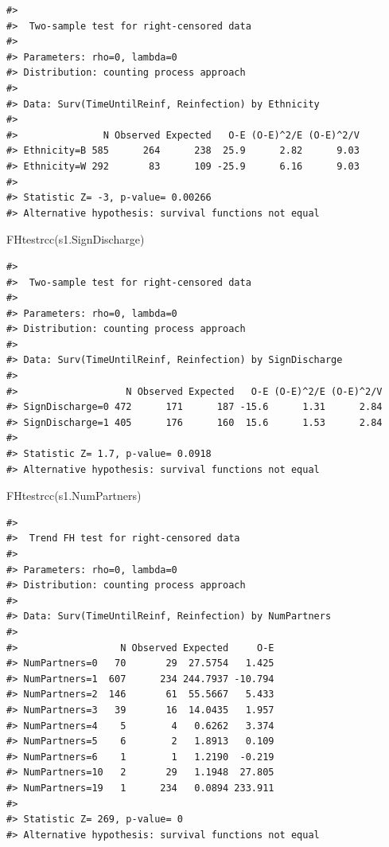 \documentclass[
]{article}
\newenvironment{Shaded}{\begin{snugshade}}{\end{snugshade}}
\newcommand{\FunctionTok}[1]{\textcolor[rgb]{0.00,0.00,0.00}{#1}}
\newcommand{\NormalTok}[1]{#1}
\begin{document}
\begin{verbatim}
#> 
#>  Two-sample test for right-censored data
#> 
#> Parameters: rho=0, lambda=0
#> Distribution: counting process approach
#> 
#> Data: Surv(TimeUntilReinf, Reinfection) by Ethnicity
#> 
#>               N Observed Expected   O-E (O-E)^2/E (O-E)^2/V
#> Ethnicity=B 585      264      238  25.9      2.82      9.03
#> Ethnicity=W 292       83      109 -25.9      6.16      9.03
#> 
#> Statistic Z= -3, p-value= 0.00266
#> Alternative hypothesis: survival functions not equal
\end{verbatim}

\begin{Shaded}
\begin{Highlighting}[]
\FunctionTok{FHtestrcc}\NormalTok{(s1.SignDischarge)}
\end{Highlighting}
\end{Shaded}

\begin{verbatim}
#> 
#>  Two-sample test for right-censored data
#> 
#> Parameters: rho=0, lambda=0
#> Distribution: counting process approach
#> 
#> Data: Surv(TimeUntilReinf, Reinfection) by SignDischarge
#> 
#>                   N Observed Expected   O-E (O-E)^2/E (O-E)^2/V
#> SignDischarge=0 472      171      187 -15.6      1.31      2.84
#> SignDischarge=1 405      176      160  15.6      1.53      2.84
#> 
#> Statistic Z= 1.7, p-value= 0.0918
#> Alternative hypothesis: survival functions not equal
\end{verbatim}

\begin{Shaded}
\begin{Highlighting}[]
\FunctionTok{FHtestrcc}\NormalTok{(s1.NumPartners)}
\end{Highlighting}
\end{Shaded}

\begin{verbatim}
#> 
#>  Trend FH test for right-censored data
#> 
#> Parameters: rho=0, lambda=0
#> Distribution: counting process approach
#> 
#> Data: Surv(TimeUntilReinf, Reinfection) by NumPartners
#> 
#>                  N Observed Expected     O-E
#> NumPartners=0   70       29  27.5754   1.425
#> NumPartners=1  607      234 244.7937 -10.794
#> NumPartners=2  146       61  55.5667   5.433
#> NumPartners=3   39       16  14.0435   1.957
#> NumPartners=4    5        4   0.6262   3.374
#> NumPartners=5    6        2   1.8913   0.109
#> NumPartners=6    1        1   1.2190  -0.219
#> NumPartners=10   2       29   1.1948  27.805
#> NumPartners=19   1      234   0.0894 233.911
#> 
#> Statistic Z= 269, p-value= 0
#> Alternative hypothesis: survival functions not equal
\end{verbatim}
\end{document}
